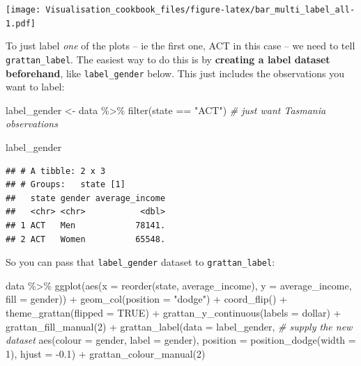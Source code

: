 \documentclass[
]{book}
\newenvironment{Shaded}{\begin{snugshade}}{\end{snugshade}}
\newcommand{\AttributeTok}[1]{\textcolor[rgb]{0.77,0.63,0.00}{#1}}
\newcommand{\CommentTok}[1]{\textcolor[rgb]{0.56,0.35,0.01}{\textit{#1}}}
\newcommand{\ConstantTok}[1]{\textcolor[rgb]{0.00,0.00,0.00}{#1}}
\newcommand{\DecValTok}[1]{\textcolor[rgb]{0.00,0.00,0.81}{#1}}
\newcommand{\FloatTok}[1]{\textcolor[rgb]{0.00,0.00,0.81}{#1}}
\newcommand{\FunctionTok}[1]{\textcolor[rgb]{0.00,0.00,0.00}{#1}}
\newcommand{\NormalTok}[1]{#1}
\newcommand{\OtherTok}[1]{\textcolor[rgb]{0.56,0.35,0.01}{#1}}
\newcommand{\SpecialCharTok}[1]{\textcolor[rgb]{0.00,0.00,0.00}{#1}}
\newcommand{\StringTok}[1]{\textcolor[rgb]{0.31,0.60,0.02}{#1}}
\begin{document}
\texttt{[image: Visualisation\_cookbook\_files/figure-latex/bar\_multi\_label\_all-1.pdf]}

To just label \emph{one} of the plots -- ie the first one, ACT in this case -- we need to tell \texttt{grattan\_label}. The easiest way to do this is by \textbf{creating a label dataset beforehand}, like \texttt{label\_gender} below. This just includes the observations you want to label:

\begin{Shaded}
\begin{Highlighting}[]
\NormalTok{label\_gender }\OtherTok{\textless{}{-}}\NormalTok{ data }\SpecialCharTok{\%\textgreater{}\%} 
  \FunctionTok{filter}\NormalTok{(state }\SpecialCharTok{==} \StringTok{"ACT"}\NormalTok{)  }\CommentTok{\# just want Tasmania observations}

\NormalTok{label\_gender}
\end{Highlighting}
\end{Shaded}

\begin{verbatim}
## # A tibble: 2 x 3
## # Groups:   state [1]
##   state gender average_income
##   <chr> <chr>           <dbl>
## 1 ACT   Men            78141.
## 2 ACT   Women          65548.
\end{verbatim}

So you can pass that \texttt{label\_gender} dataset to \texttt{grattan\_label}:

\begin{Shaded}
\begin{Highlighting}[]
\NormalTok{data }\SpecialCharTok{\%\textgreater{}\%} 
  \FunctionTok{ggplot}\NormalTok{(}\FunctionTok{aes}\NormalTok{(}\AttributeTok{x =} \FunctionTok{reorder}\NormalTok{(state, average\_income), }
             \AttributeTok{y =}\NormalTok{ average\_income,}
             \AttributeTok{fill =}\NormalTok{ gender)) }\SpecialCharTok{+} 
  \FunctionTok{geom\_col}\NormalTok{(}\AttributeTok{position =} \StringTok{"dodge"}\NormalTok{) }\SpecialCharTok{+} 
  \FunctionTok{coord\_flip}\NormalTok{() }\SpecialCharTok{+} 
  \FunctionTok{theme\_grattan}\NormalTok{(}\AttributeTok{flipped =} \ConstantTok{TRUE}\NormalTok{) }\SpecialCharTok{+} 
  \FunctionTok{grattan\_y\_continuous}\NormalTok{(}\AttributeTok{labels =}\NormalTok{ dollar) }\SpecialCharTok{+} 
  \FunctionTok{grattan\_fill\_manual}\NormalTok{(}\DecValTok{2}\NormalTok{) }\SpecialCharTok{+} 
  \FunctionTok{grattan\_label}\NormalTok{(}\AttributeTok{data =}\NormalTok{ label\_gender,  }\CommentTok{\# supply the new dataset}
                \FunctionTok{aes}\NormalTok{(}\AttributeTok{colour =}\NormalTok{ gender,}
                    \AttributeTok{label =}\NormalTok{ gender), }
                \AttributeTok{position =} \FunctionTok{position\_dodge}\NormalTok{(}\AttributeTok{width =} \DecValTok{1}\NormalTok{), }
                \AttributeTok{hjust =} \SpecialCharTok{{-}}\FloatTok{0.1}\NormalTok{) }\SpecialCharTok{+} 
  \FunctionTok{grattan\_colour\_manual}\NormalTok{(}\DecValTok{2}\NormalTok{)}
\end{Highlighting}
\end{Shaded}
\end{document}
